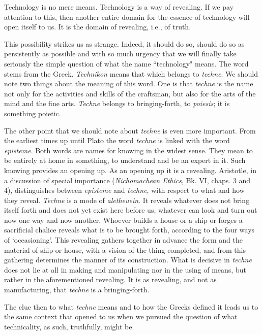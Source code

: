 \documentclass[paper=a4, fontsize=11pt,twoside]{scrartcl}
\begin{document}
Technology is no mere means. Technology is a way of revealing. If we pay attention to this, then another entire domain for the essence of technology will open itself to us. It is the domain of revealing, i.e., of truth.

This possibility strikes us as strange. Indeed, it should do so, should do so as persistently as possible and with so much urgency that we will finally take seriously the simple question of what the name ``technology" means. The word stems from the Greek. \textit{Technikon} means that which belongs to \textit{techn{\-e}}. We should note two things about the meaning of this word. One is that \textit{techn{\-e}} is the name not only for the activities and skills of the craftsman, but also for the arts of the mind and the fine arts. \textit{Techn{\-e}} belongs to bringing-forth, to \textit{poi{\-e}sis}; it is something poietic.

The other point that we should note about \textit{techn{\-e}} is even more important. From the earliest times up until Plato the word \textit{techn{\-e}} is linked with the word \textit{epist{\-e}m{\-e}}. Both words are names for knowing in the widest sense. They mean to be entirely at home in something, to understand and be an expert in it. Such knowing provides an opening up. As an opening up it is a revealing. Aristotle, in a discussion of special importance (\textit{Nichomachean Ethics}, Bk. VI, chaps. 3 and 4), distinguishes between \textit{epist{\-e}m{\-e}} and \textit{techn{\-e}}, with respect to what and how they reveal. \textit{Techn{\-e}} is a mode of \textit{al{\-e}theuein}. It reveals whatever does not bring itself forth and does not yet exist here before us, whatever can look and turn out now one way and now another. Whoever builds a house or a ship or forges a sacrificial chalice reveals what is to be brought forth, according to the four ways of `occasioning'. This revealing gathers together in advance the form and the material of ship or house, with a vision of the thing completed, and from this gathering determines the manner of its construction. What is decisive in \textit{techn{\-e}} does not lie at all in making and manipulating nor in the using of means, but rather in the aforementioned revealing. It is as revealing, and not as manufacturing, that \textit{techn{\-e}} is a bringing-forth.

The clue then to what \textit{techn{\-e}} means and to how the Greeks defined it leads us to the same context that opened to us when we pursued the question of what technicality, as such, truthfully, might be.
\end{document}
